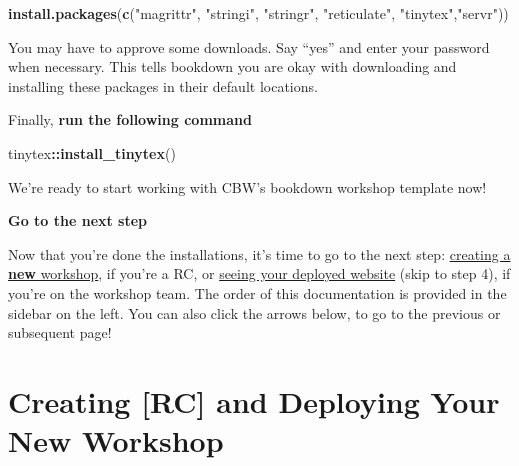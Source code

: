 \documentclass[
]{book}
\newenvironment{Shaded}{\begin{snugshade}}{\end{snugshade}}
\newcommand{\FunctionTok}[1]{\textcolor[rgb]{0.13,0.29,0.53}{\textbf{#1}}}
\newcommand{\NormalTok}[1]{#1}
\newcommand{\SpecialCharTok}[1]{\textcolor[rgb]{0.81,0.36,0.00}{\textbf{#1}}}
\newcommand{\StringTok}[1]{\textcolor[rgb]{0.31,0.60,0.02}{#1}}
\newenvironment{bluebox}{
  \definecolor{shadecolor}{RGB}{172, 210, 237}
  \color{white}
  \begin{shaded}}
 {\end{shaded}}
\theoremstyle{definition}
\theoremstyle{definition}
\theoremstyle{definition}
\theoremstyle{definition}
\theoremstyle{remark}
\begin{document}
\begin{enumerate}
\begin{itemize}
\begin{Shaded}
\begin{Highlighting}[]
\FunctionTok{install.packages}\NormalTok{(}\FunctionTok{c}\NormalTok{(}\StringTok{"magrittr"}\NormalTok{, }\StringTok{"stringi"}\NormalTok{, }\StringTok{"stringr"}\NormalTok{, }\StringTok{"reticulate"}\NormalTok{, }\StringTok{"tinytex"}\NormalTok{,}\StringTok{"servr"}\NormalTok{))}
\end{Highlighting}
\end{Shaded}

    You may have to approve some downloads. Say ``yes'' and enter your password when necessary. This tells bookdown you are okay with downloading and installing these packages in their default locations.

    Finally, \textbf{run the following command}

\begin{Shaded}
\begin{Highlighting}[]
\NormalTok{tinytex}\SpecialCharTok{::}\FunctionTok{install\_tinytex}\NormalTok{()}
\end{Highlighting}
\end{Shaded}
  \end{itemize}
\end{enumerate}

We're ready to start working with CBW's bookdown workshop template now!

\begin{bluebox}

\begin{center}
\textbf{Go to the next step}

\end{center}

Now that you're done the installations, it's time to go to the next step: \hyperref[rc-workshop-setup]{creating a \textbf{new} workshop}, if you're a RC, or \hyperref[check-deploy]{seeing your deployed website} (skip to step 4), if you're on the workshop team. The order of this documentation is provided in the sidebar on the left. You can also click the arrows below, to go to the previous or subsequent page!

\end{bluebox}

\chapter{\texorpdfstring{Creating {[}RC{]} and Deploying Your \textbf{New} Workshop}{Creating {[}RC{]} and Deploying Your New Workshop}}\label{creating-rc-and-deploying-your-new-workshop}
\end{document}
